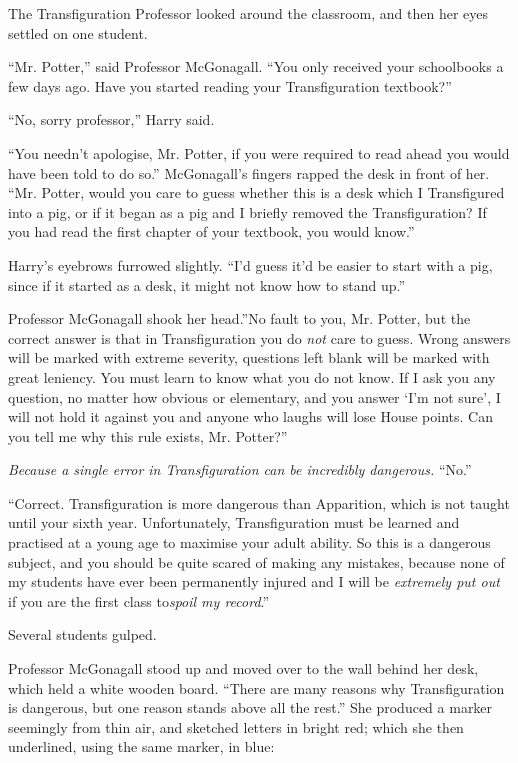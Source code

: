 The Transfiguration Professor looked around the classroom, and then her
eyes settled on one student.

``Mr. Potter,'' said Professor McGonagall. ``You only received your
schoolbooks a few days ago. Have you started reading your
Transfiguration textbook?''

``No, sorry professor,'' Harry said.

``You needn't apologise, Mr. Potter, if you were required to read ahead
you would have been told to do so.'' McGonagall's fingers rapped the
desk in front of her. ``Mr. Potter, would you care to guess whether this
is a desk which I Transfigured into a pig, or if it began as a pig and I
briefly removed the Transfiguration? If you had read the first chapter
of your textbook, you would know.''

Harry's eyebrows furrowed slightly. ``I'd guess it'd be easier to start
with a pig, since if it started as a desk, it might not know how to
stand up.''

Professor McGonagall shook her head.''No fault to you, Mr. Potter, but
the correct answer is that in Transfiguration you do \emph{not} care to
guess. Wrong answers will be marked with extreme severity, questions
left blank will be marked with great leniency. You must learn to know
what you do not know. If I ask you any question, no matter how obvious
or elementary, and you answer `I'm not sure', I will not hold it against
you and anyone who laughs will lose House points. Can you tell me why
this rule exists, Mr. Potter?''

\emph{Because a single error in Transfiguration can be incredibly
dangerous.} ``No.''

``Correct. Transfiguration is more dangerous than Apparition, which is
not taught until your sixth year. Unfortunately, Transfiguration must be
learned and practised at a young age to maximise your adult ability. So
this is a dangerous subject, and you should be quite scared of making
any mistakes, because none of my students have ever been permanently
injured and I will be \emph{extremely put out} if you are the first
class to\emph{spoil my record}.''

Several students gulped.

Professor McGonagall stood up and moved over to the wall behind her
desk, which held a white wooden board. ``There are many reasons why
Transfiguration is dangerous, but one reason stands above all the
rest.'' She produced a marker seemingly from thin air, and sketched
letters in bright red; which she then underlined, using the same marker,
in blue:


